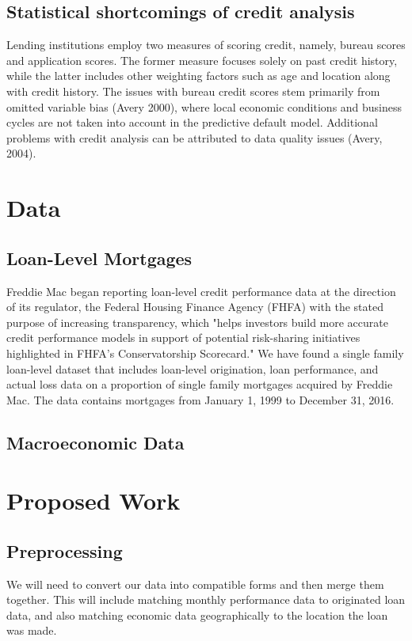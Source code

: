 \documentclass[sigconf, 11pt]{acmart}
\begin{document}
\subsection{Statistical shortcomings of credit analysis}
Lending institutions employ two measures of scoring credit, namely, bureau scores and application scores. The former measure focuses solely on past credit history, while the latter includes other weighting factors such as age and location along with credit history. The issues with bureau credit scores stem primarily from omitted variable bias (Avery 2000), where local economic conditions and business cycles are not taken into account in the predictive default model. Additional problems with credit analysis can be attributed to data quality issues (Avery, 2004).

\section{Data}

\subsection{Loan-Level Mortgages}
Freddie Mac began reporting loan-level credit performance data at the direction of its regulator, the Federal Housing Finance Agency (FHFA) with the stated purpose of increasing transparency, which "helps investors build more accurate credit performance models in support of potential risk-sharing initiatives highlighted in FHFA's Conservatorship Scorecard." We have found a single family loan-level dataset that includes loan-level origination, loan performance, and actual loss data on a proportion of single family mortgages acquired by Freddie Mac. The data contains mortgages from January 1, 1999 to December 31, 2016. 
\subsection{Macroeconomic Data}

\section{Proposed Work}
\subsection{Preprocessing}
We will need to convert our data into compatible forms and then merge them together. This will include matching monthly performance data to originated loan data, and also matching economic data geographically to the location the loan was made.
\end{document}
